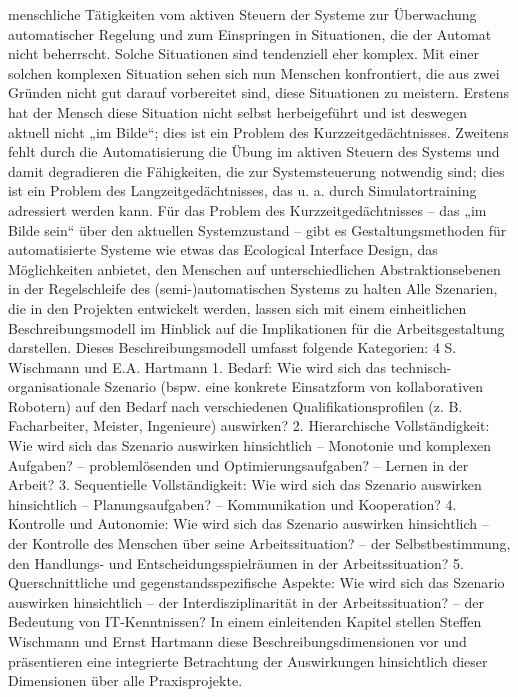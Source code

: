 menschliche Tätigkeiten vom aktiven Steuern der Systeme zur Überwachung automatischer Regelung und zum Einspringen in Situationen, die der Automat nicht beherrscht.
Solche Situationen sind tendenziell eher komplex. Mit einer solchen komplexen Situation sehen sich nun Menschen konfrontiert, die aus zwei Gründen nicht gut darauf
vorbereitet sind, diese Situationen zu meistern. Erstens hat der Mensch diese Situation nicht selbst herbeigeführt und ist deswegen aktuell nicht „im Bilde“; dies ist ein
Problem des Kurzzeitgedächtnisses. Zweitens fehlt durch die Automatisierung die
Übung im aktiven Steuern des Systems und damit degradieren die Fähigkeiten, die zur
Systemsteuerung notwendig sind; dies ist ein Problem des Langzeitgedächtnisses, das
u. a. durch Simulatortraining adressiert werden kann. Für das Problem des Kurzzeitgedächtnisses – das „im Bilde sein“ über den aktuellen Systemzustand – gibt es Gestaltungsmethoden für automatisierte Systeme wie etwas das Ecological Interface Design,
das Möglichkeiten anbietet, den Menschen auf unterschiedlichen Abstraktionsebenen
in der Regelschleife des (semi-)automatischen Systems zu halten
Alle Szenarien, die in den Projekten entwickelt werden, lassen sich mit einem einheitlichen Beschreibungsmodell im Hinblick auf die Implikationen für die Arbeitsgestaltung
darstellen. Dieses Beschreibungsmodell umfasst folgende Kategorien:
4 S. Wischmann und E.A. Hartmann
1. Bedarf: Wie wird sich das technisch-organisationale Szenario (bspw. eine konkrete
Einsatzform von kollaborativen Robotern) auf den Bedarf nach verschiedenen Qualifikationsprofilen (z. B. Facharbeiter, Meister, Ingenieure) auswirken?
2. Hierarchische Vollständigkeit: Wie wird sich das Szenario auswirken hinsichtlich
– Monotonie und komplexen Aufgaben?
– problemlösenden und Optimierungsaufgaben?
– Lernen in der Arbeit?
3. Sequentielle Vollständigkeit: Wie wird sich das Szenario auswirken hinsichtlich
– Planungsaufgaben?
– Kommunikation und Kooperation?
4. Kontrolle und Autonomie: Wie wird sich das Szenario auswirken hinsichtlich
– der Kontrolle des Menschen über seine Arbeitssituation?
– der Selbstbestimmung, den Handlungs- und Entscheidungsspielräumen in der
Arbeitssituation?
5. Querschnittliche und gegenstandsspezifische Aspekte: Wie wird sich das Szenario auswirken hinsichtlich
– der Interdisziplinarität in der Arbeitssituation?
– der Bedeutung von IT-Kenntnissen?
In einem einleitenden Kapitel stellen Steffen Wischmann und Ernst Hartmann diese
Beschreibungsdimensionen vor und präsentieren eine integrierte Betrachtung der Auswirkungen hinsichtlich dieser Dimensionen über alle Praxisprojekte.
